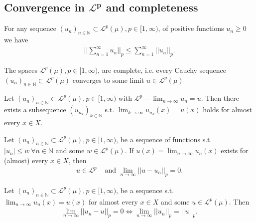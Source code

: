 \subsection*{Convergence in \(\boldsymbol{\mathcal{L}^p}\) and completeness}
\begin{lemma}
    For any sequence \((u_n)_{n\in\mathbb{N}}\subset\mathcal{L}^p(\mu), p\in[1,\infty)\), of positive functions \(u_n\geq 0\) we have
    \begin{align*}
        \Big\vert \Big\vert \sum\limits^{\infty}_{n=1} u_n \Big\vert\Big\vert_p \leq \sum\limits_{n=1}^{\infty}\vert\vert u_n\vert\vert_p.
    \end{align*}
\end{lemma}
\begin{theorem}
    The spaces \(\mathcal{L}^p(\mu), p\in[1,\infty)\), are complete, i.e. every Cauchy sequence \((u_n)_{n\in\mathbb{N}}\subset\mathcal{L}^p(\mu)\) 
    converges to some limit \(u\in\mathcal{L}^p(\mu)\)
\end{theorem}
\begin{corollary}
    Let \((u_n)_{n\in\mathbb{N}}\subset \mathcal{L}^p(\mu), p\in[1,\infty)\) with \(\mathcal{L}^p-\lim_{n\rightarrow\infty}u_n=u\). Then there 
    exists a subsequence \((u_{n_k})_{k\in\mathbb{N}}\) s.t. \(\lim_{k\rightarrow\infty}u_{n_k}(x)=u(x)\) holds for almost every \(x\in X\).
\end{corollary}
\begin{theorem}
    Let \((u_n)_{n\in\mathbb{N}}\subset\mathcal{L}^p(\mu),p\in[1,\infty)\), be a sequence of functions s.t. \(|u_n|\leq w\ \forall n\in\mathbb{N}\)
    and some \(w\in\mathcal{L}^p(\mu)\). If \(u(x)=\lim_{n\rightarrow\infty}u_n(x)\) exists for (almost) every \(x\in X\), then
    \begin{align*}
        u\in\mathcal{L}^p &\text{ and } \lim\limits_{n\rightarrow\infty}||u-u_n||_p =0.
    \end{align*}
\end{theorem}
\begin{theorem}
    Let \((u_n)_{n\in\mathbb{N}}\subset\mathcal{L}^p(\mu),p\in[1,\infty)\), be a sequence s.t. \(\lim_{n\rightarrow\infty}u_n(x)=u(x)\)
    for almost every \(x\in X\) and some \(u\in\mathcal{L}^p(\mu)\). Then
    \begin{align*}
        \lim\limits_{n\rightarrow\infty}||u_n-u||_p = 0 \Longleftrightarrow \lim\limits_{n\rightarrow\infty} ||u_n||_p = ||u||_p.
    \end{align*}
\end{theorem}